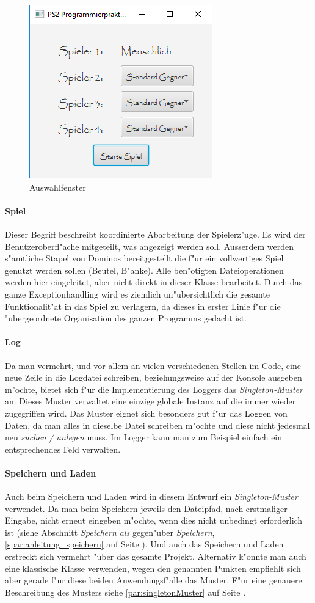 \begin{figure}
	\centering
	\includegraphics[width=.4\linewidth]{pics/Intro240918}
	\caption[Auswahlfenster]{Auswahlfenster}
	\label{fig:auswahlfenster}
\end{figure}

\paragraph{Spiel}
Dieser Begriff beschreibt koordinierte Abarbeitung der Spielerz"uge. Es wird der Benutzeroberfl"ache mitgeteilt, was angezeigt werden soll. Ausserdem werden s"amtliche Stapel von Dominos bereitgestellt die f"ur ein vollwertiges Spiel genutzt werden sollen (Beutel, B"anke). Alle ben"otigten Dateioperationen werden hier eingeleitet, aber nicht direkt in dieser Klasse bearbeitet. Durch das ganze Exceptionhandling wird es ziemlich un"ubersichtlich die gesamte Funktionalit"at in das Spiel zu verlagern, da dieses in erster Linie f"ur die "ubergeordnete Organisation des ganzen Programms gedacht ist. 

\paragraph{Log}
Da man vermehrt, und vor allem an vielen verschiedenen Stellen im Code, eine neue Zeile in die Logdatei schreiben, beziehungsweise auf der Konsole ausgeben m"ochte, bietet sich f"ur die Implementierung des Loggers das \emph{Singleton-Muster} an. Dieses Muster verwaltet eine einzige globale Instanz auf die immer wieder zugegriffen wird. Das Muster eignet sich besonders gut f"ur das Loggen von Daten, da man alles in dieselbe Datei schreiben m"ochte und diese nicht jedesmal neu \emph{suchen / anlegen} muss. Im Logger kann man zum Beispiel einfach ein entsprechendes Feld verwalten. 

\paragraph{Speichern und Laden}
Auch beim Speichern und Laden wird in diesem Entwurf ein \emph{Singleton-Muster} verwendet. Da man beim Speichern jeweils den Dateipfad, nach erstmaliger Eingabe, nicht erneut eingeben m"ochte, wenn dies nicht unbedingt erforderlich ist (siehe Abschnitt 
\emph{Speichern als} gegen"uber \emph{Speichern}, \ref{spar:anleitung_speichern} auf Seite \pageref{spar:anleitung_speichern}). Und auch das Speichern und Laden erstreckt sich vermehrt "uber das gesamte Projekt. Alternativ k"onnte man auch eine klassische Klasse verwenden, wegen den genannten Punkten empfiehlt sich aber gerade f"ur diese beiden Anwendungsf"alle das Muster. F"ur eine genauere Beschreibung des Musters siehe \ref{par:singletonMuster}  auf Seite \pageref{par:singletonMuster}. 
